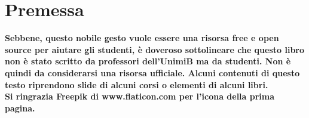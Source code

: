 \documentclass[a4paper,12pt, oneside]{book}
\begin{document}
\chapter*{Premessa}
\textbf{Sebbene, questo nobile gesto vuole essere una risorsa free e open source per aiutare gli studenti, è doveroso sottolineare che questo libro non è stato scritto da professori dell'UnimiB ma da studenti. Non è quindi da considerarsi una risorsa ufficiale. Alcuni contenuti di questo testo riprendono slide di alcuni corsi o elementi di alcuni libri. \\ Si ringrazia Freepik di www.flaticon.com per l'icona della prima pagina.}







\end{document}
